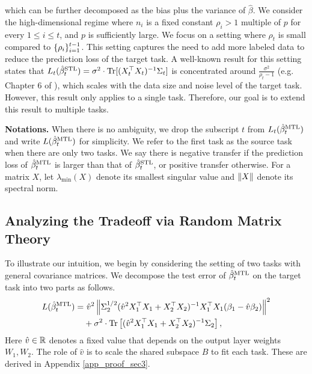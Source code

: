 which can be further decomposed as the bias plus the variance of $\hat{\beta}$.
We consider the high-dimensional regime where $n_i$ is a fixed constant $\rho_i > 1$  multiple of $p$ for every $1\le i\le t$, and $p$ is sufficiently large.
We focus on a setting where $\rho_t$ is small compared to $\{\rho_i\}_{i=1}^{t-1}$.
This setting captures the need to add more labeled data to reduce the prediction loss of the target task.
A well-known result for this setting states that $L_t(\hat{\beta}_t^{\text{STL}}) = \sigma^2 \cdot \operatorname{Tr}[(X_t^{\top}X_t)^{-1}\Sigma_t]$ is concentrated around $\frac {\sigma^2} {\rho_t - 1}$ (e.g. Chapter 6 of \cite{S07}), which scales with the data size and noise level of the target task.
However, this result only applies to a single task.
Therefore, our goal is to extend this result to multiple tasks.

\textbf{Notations.}
When there is no ambiguity, we drop the subscript $t$ from $L_t(\hat{\beta}_t^{\text{MTL}})$ and write $L(\hat{\beta}_t^{\text{MTL}})$ for simplicity.
We refer to the first task as the source task when there are only two tasks.
We say there is negative transfer if the prediction loss of $\hat{\beta}_t^{\text{MTL}}$ is larger than that of $\hat{\beta}_t^{\text{STL}}$, or positive transfer otherwise.
For a matrix $X$, let $\lambda_{\min}(X)$ denote its smallest singular value and $\|X\|$ denote its spectral norm.

\subsection{Analyzing the Tradeoff via Random Matrix Theory}

To illustrate our intuition, we begin by considering the setting of two tasks with general covariance matrices.
We decompose the test error of $\hat{\beta}_{t}^{\text{MTL}}$ on the target task into two parts as follows.
\begin{align}
	L(\hat{\beta}_t^{\text{MTL}}) =& ~ \hat{v}^2 \left\| \Sigma_2^{1/2} (\hat{v}^2 X_1^{\top}X_1 + X_2^{\top}X_2)^{-1}X_1^{\top}X_1 (\beta_1 - \hat{v}\beta_2) \right\|^2 \label{eq_te_model_shift} \\
	&+ \sigma^2\cdot \operatorname{Tr}\left[(\hat{v}^2 X_1^{\top}X_1 + X_2^{\top}X_2)^{-1}\Sigma_2\right], \label{eq_te_var}
\end{align}
Here $\hat{v}\in\mathbb{R}$ denotes a fixed value that depends on the output layer weights $W_1, W_2$.
The role of $\hat{v}$ is to scale the shared subspace $B$ to fit each task.
These are derived in Appendix \ref{app_proof_sec3}.

